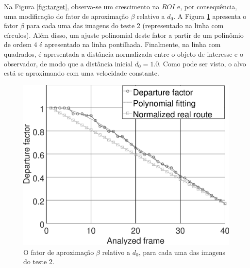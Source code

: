 Na Figura \ref{fig:target}, observa-se um crescimento na $ROI$ e, por
consequência, uma modificação do fator de aproximação $\beta$ relativo a $d_0$.
A Figura \ref{fig:res_grapha_b} apresenta o fator $\beta$ para cada uma das imagens 
do teste 2 (representado na linha com círculos).
Além disso, um ajuste polinomial deste fator a partir de um polinômio de ordem 4 é apresentado na linha pontilhada.
Finalmente, na linha com quadrados, é apresentada a distância normalizada entre o objeto de interesse e o observador,
de modo que a distância inicial $d_0=1.0$.
Como pode ser visto, o alvo está se aproximando com uma velocidade constante.
\begin{figure}[H]
\includegraphics[width=\columnwidth]{images/grapha_b.eps}
\caption{O fator de aproximação $\beta$ relativo a $d_0$, para cada uma das imagens do teste 2.}
\label{fig:res_grapha_b}
\end{figure}



